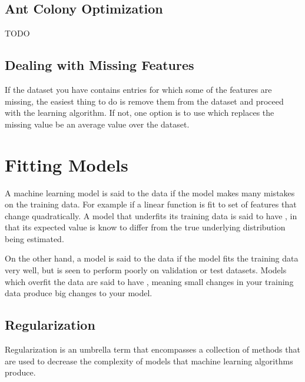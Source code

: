 
\subsection{Ant Colony Optimization}
TODO

\subsection{Dealing with Missing Features}
If the dataset you have contains entries for which some of the features are missing, the easiest thing to do is remove them from the dataset and proceed with the learning algorithm. If not, one option is to use  which replaces the missing value be an average value over the dataset.


\section{Fitting Models}

A machine learning model is said to  the data if the model makes many mistakes on the training data. For example if a linear function is fit to set of features that change quadratically. A model that underfits its training data is said to have , in that its expected value is know to differ from the true underlying distribution being estimated.

On the other hand, a model is said to  the data if the model fits the training data very well, but is seen to perform poorly on validation or test datasets. Models which overfit the data are said to have , meaning small changes in your training data produce big changes to your model.

\subsection{Regularization}
Regularization is an umbrella term that encompasses a collection of methods that are used to decrease the complexity of models that machine learning algorithms produce.


